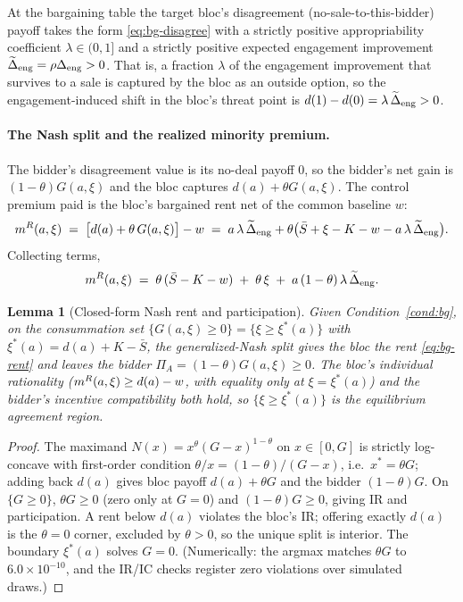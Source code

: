 \documentclass[11pt]{article}
\newtheorem{lemma}{Lemma}
\newcommand{\1}{\mathbf{1}}
\begin{document}
\begin{condition}
\label{cond:bg}
At the bargaining table the target bloc's disagreement (no-sale-to-this-bidder) payoff takes the form \eqref{eq:bg-disagree} with a strictly positive appropriability coefficient $\lambda\in(0,1]$ and a strictly positive expected engagement improvement $\widetilde{\Delta}_{\mathrm{eng}}=\rho\Delta_{\mathrm{eng}}>0$. That is, a fraction $\lambda$ of the engagement improvement that survives to a sale is captured by the bloc as an outside option, so the engagement-induced shift in the bloc's threat point is $d(1)-d(0)=\lambda\,\widetilde{\Delta}_{\mathrm{eng}}>0$.
\end{condition}

\paragraph{The Nash split and the realized minority premium.}
The bidder's disagreement value is its no-deal payoff $0$, so the bidder's net gain is $(1-\theta)G(a,\xi)$ and the bloc captures $d(a)+\theta G(a,\xi)$. The control premium paid is the bloc's bargained rent net of the common baseline $w$:
\begin{equation}
  \label{eq:bg-rent}
  m^{R}(a,\xi)\;=\;\bigl[d(a)+\theta\,G(a,\xi)\bigr]-w
  \;=\;a\,\lambda\,\widetilde{\Delta}_{\mathrm{eng}}
       +\theta\bigl(\bar S+\xi-K-w-a\,\lambda\,\widetilde{\Delta}_{\mathrm{eng}}\bigr).
\end{equation}
Collecting terms,
\begin{equation}
  \label{eq:bg-rent2}
  m^{R}(a,\xi)\;=\;\theta\,(\bar S-K-w)\;+\;\theta\,\xi\;+\;a\,(1-\theta)\,\lambda\,\widetilde{\Delta}_{\mathrm{eng}} .
\end{equation}

\begin{lemma}[Closed-form Nash rent and participation]
\label{lem:bg-split}
\emph{Given} Condition~\ref{cond:bg}, on the consummation set $\{G(a,\xi)\ge0\}=\{\xi\ge\xi^{\ast}(a)\}$ with $\xi^{\ast}(a)=d(a)+K-\bar S$, the generalized-Nash split gives the bloc the rent \eqref{eq:bg-rent} and leaves the bidder $\Pi_{A}=(1-\theta)G(a,\xi)\ge0$. The bloc's individual rationality ($m^{R}(a,\xi)\ge d(a)-w$, with equality only at $\xi=\xi^{\ast}(a)$) and the bidder's incentive compatibility both hold, so $\{\xi\ge\xi^{\ast}(a)\}$ is the equilibrium agreement region.
\end{lemma}

\begin{proof}
The maximand $N(x)=x^{\theta}(G-x)^{1-\theta}$ on $x\in[0,G]$ is strictly log-concave with first-order condition $\theta/x=(1-\theta)/(G-x)$, i.e.\ $x^{\ast}=\theta G$; adding back $d(a)$ gives bloc payoff $d(a)+\theta G$ and the bidder $(1-\theta)G$. On $\{G\ge0\}$, $\theta G\ge0$ (zero only at $G=0$) and $(1-\theta)G\ge0$, giving IR and participation. A rent below $d(a)$ violates the bloc's IR; offering exactly $d(a)$ is the $\theta=0$ corner, excluded by $\theta>0$, so the unique split is interior. The boundary $\xi^{\ast}(a)$ solves $G=0$. (Numerically: the argmax matches $\theta G$ to $6.0\times10^{-10}$, and the IR/IC checks register zero violations over simulated draws.)
\end{proof}
\end{document}
